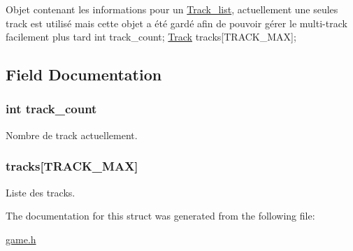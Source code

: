 Objet contenant les informations pour un \hyperlink{struct_track__list}{Track\+\_\+list}, actuellement une seules track est utilisé mais cette objet a été gardé afin de pouvoir gérer le multi-\/track facilement plus tard int track\+\_\+count; \hyperlink{struct_track}{Track} tracks\mbox{[}T\+R\+A\+C\+K\+\_\+\+M\+AX\mbox{]}; 

\subsection{Field Documentation}
\subsubsection[{\texorpdfstring{track\+\_\+count}{track_count}}]{\setlength{\rightskip}{0pt plus 5cm}int track\+\_\+count}\hypertarget{struct_track__list_ac955ea3b75270e8be80c62e8e6f4abc2}{}\label{struct_track__list_ac955ea3b75270e8be80c62e8e6f4abc2}
Nombre de track actuellement. 
\subsubsection[{\texorpdfstring{tracks}{tracks}}]{ tracks\mbox{[}T\+R\+A\+C\+K\+\_\+\+M\+AX\mbox{]}}\hypertarget{struct_track__list_a7c409b6c0307ab068387e40e51f139f9}{}\label{struct_track__list_a7c409b6c0307ab068387e40e51f139f9}
Liste des tracks. 

The documentation for this struct was generated from the following file\+:\begin{DoxyCompactItemize}
\item 
\hyperlink{game_8h}{game.\+h}\end{DoxyCompactItemize}
